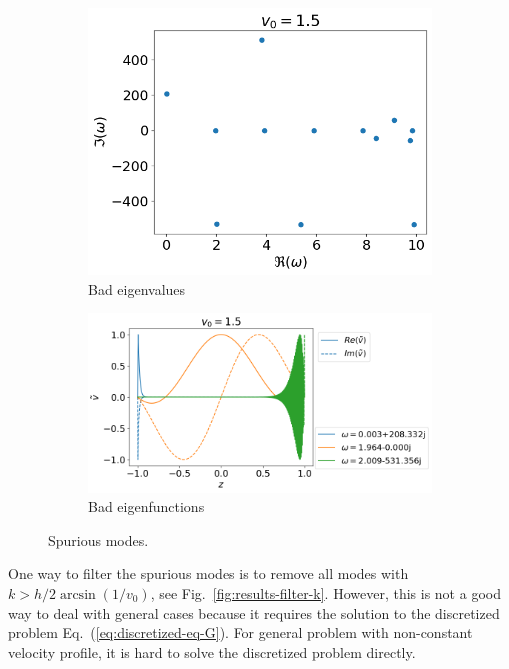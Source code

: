 \begin{figure}[H]
	\centering
	\begin{subfigure}[b]{0.5\linewidth}
		\includegraphics[width=\linewidth]{figures/eigvals-bad}
		\caption{Bad eigenvalues}
	\end{subfigure}%
	\begin{subfigure}[b]{0.5\linewidth}
		\includegraphics[width=\linewidth]{figures/eigvecs-bad}
		\caption{Bad eigenfunctions}
	\end{subfigure}
	\caption{Spurious modes.}
	\label{fig:results-bad}
\end{figure}

One way to filter the spurious modes is to remove all modes with $k>h/2 \arcsin(1/v_0)$, see Fig.~\ref{fig:results-filter-k}. However, this is not a good way to deal with general cases because it requires the solution to the discretized problem Eq.~(\ref{eq:discretized-eq-G}). For general problem with non-constant velocity profile, it is hard to solve the discretized problem directly.

